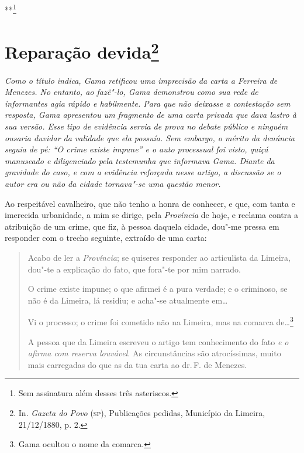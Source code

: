 \hfill***\footnote{Sem assinatura além desses três asteriscos.}


\chapter{Reparação devida\footnote[*]{In. \emph{Gazeta do Povo} (\textsc{sp}),
  Publicações pedidas, Município da Limeira, 21/12/1880, p. 2.}}

\begin{flushleft}
{\footnotesize\itshape
Como o título indica, Gama retificou uma imprecisão da carta a
Ferreira de Menezes. No entanto, ao fazê"-lo, Gama demonstrou como sua
rede de informantes agia rápido e habilmente. Para que não deixasse a
contestação sem resposta, Gama apresentou um fragmento de uma carta
privada que dava lastro à sua versão. Esse tipo de evidência servia de
prova no debate público e ninguém ousaria duvidar da validade que ela
possuía. Sem embargo, o mérito da denúncia seguia de pé: ``O crime existe
impune'' e o auto processual foi visto, quiçá manuseado e diligenciado
pela testemunha que informava Gama. Diante da gravidade do caso, e com a
evidência reforçada nesse artigo, a discussão se o autor era ou não da
cidade tornava"-se uma questão menor. }
\end{flushleft}

\noindent{}Ao respeitável cavalheiro, que não tenho a honra de conhecer, e que, com
tanta e imerecida urbanidade, a mim se dirige, pela \emph{Província} de
hoje, e reclama contra a atribuição de um crime, que fiz, à pessoa
daquela cidade, dou"-me pressa em responder com o trecho seguinte,
extraído de uma carta:

\noindent\dotfill{}

\begin{quote}
Acabo de ler a \emph{Província}; se quiseres responder ao articulista
da Limeira, dou"-te a explicação do fato, que fora"-te por mim narrado.

O crime existe impune; o que afirmei é a pura verdade; e o criminoso, se
não é da Limeira, lá residiu; e acha"-se atualmente em\ldots{}

Vi o processo; o crime foi cometido não na Limeira, mas na comarca
de\ldots{}\footnote{Gama ocultou o nome da comarca.}

A pessoa que da Limeira
escreveu o artigo tem conhecimento do fato \emph{e o afirma com reserva
louvável}. As circunstâncias são atrocíssimas, muito mais carregadas do
que as da tua carta ao dr.\,F. de Menezes.
\end{quote}

